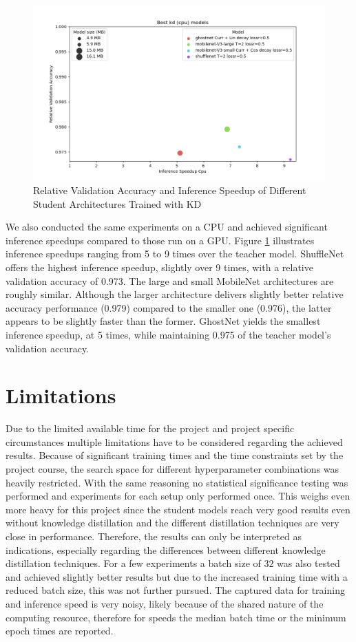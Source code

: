 \documentclass[11pt]{article}
\begin{document}
\begin{figure}[htbp]
	\centering
	\includegraphics[width=0.9\linewidth]{assets/fat_plot_best KD (CPU)}
	\caption{Relative Validation Accuracy and Inference Speedup of Different Student Architectures Trained with KD}
	\label{fig:scatter_kd_cpu_res}
\end{figure}

We also conducted the same experiments on a CPU and achieved significant inference speedups compared to those run on a GPU. Figure \ref{fig:scatter_kd_cpu_res} illustrates inference speedups ranging from 5 to 9 times over the teacher model. ShuffleNet offers the highest inference speedup, slightly over 9 times, with a relative validation accuracy of 0.973. The large and small MobileNet architectures are roughly similar. Although the larger architecture delivers slightly better relative accuracy performance (0.979) compared to the smaller one (0.976), the latter appears to be slightly faster than the former. GhostNet yields the smallest inference speedup, at 5 times, while maintaining 0.975 of the teacher model's validation accuracy.

\section{Limitations}
Due to the limited available time for the project and project specific circumstances multiple limitations have to be considered regarding the achieved results. Because of significant training times and the time constraints set by the project course, the search space for different hyperparameter combinations was heavily restricted. With the same reasoning no statistical significance testing was performed and experiments for each setup only performed once. This weighs even more heavy for this project since the student models reach very good results even without knowledge distillation and the different distillation techniques are very close in performance. Therefore, the results can only be interpreted as indications, especially regarding the differences between different knowledge distillation techniques.
For a few experiments a batch size of $ 32 $ was also tested and achieved slightly better results but due to the increased training time with a reduced batch size, this was not further pursued.
The captured data for training and inference speed is very noisy, likely because of the shared nature of the computing resource, therefore for speeds the median batch time or the minimum epoch times are reported.
\end{document}
